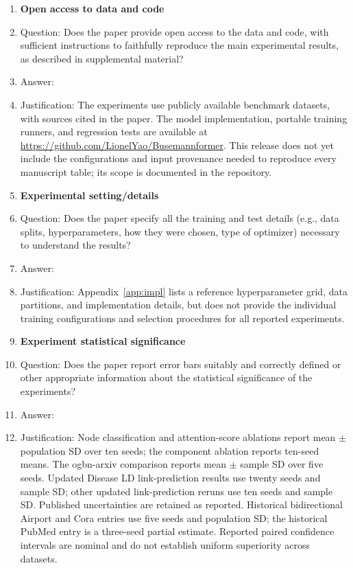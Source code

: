 \begin{enumerate}
\item {\bf Open access to data and code}
    \item[] Question: Does the paper provide open access to the data and code, with sufficient instructions to faithfully reproduce the main experimental results, as described in supplemental material?
    \item[] Answer: \answerYes{}
    \item[] Justification: The experiments use publicly available benchmark datasets, with sources
    cited in the paper. The model implementation, portable training runners,
    and regression tests are available at
    \url{https://github.com/LionelYao/Busemannformer}.
    This release does not yet include the configurations and input provenance
    needed to reproduce every manuscript table; its scope is documented in
    the repository.

\item {\bf Experimental setting/details}
    \item[] Question: Does the paper specify all the training and test details (e.g., data splits, hyperparameters, how they were chosen, type of optimizer) necessary to understand the results?
    \item[] Answer: \answerYes{}
    \item[] Justification: Appendix~\ref{app:impl} lists a reference hyperparameter grid, data partitions, and implementation details, but does not provide the individual training configurations and selection procedures for all reported experiments.

\item {\bf Experiment statistical significance}
    \item[] Question: Does the paper report error bars suitably and correctly defined or other appropriate information about the statistical significance of the experiments?
    \item[] Answer: \answerYes{}
    \item[] Justification: Node classification and attention-score ablations report mean
    $\pm$ population SD over ten seeds; the component ablation reports
    ten-seed means. The ogbn-arxiv comparison reports mean $\pm$ sample SD
    over five seeds. Updated Disease LD link-prediction results use twenty
    seeds and sample SD; other updated link-prediction reruns use ten seeds
    and sample SD. Published uncertainties are retained as reported.
    Historical bidirectional Airport and Cora entries use five seeds and
    population SD; the historical PubMed entry is a three-seed partial
    estimate. Reported paired confidence intervals are nominal and do not
    establish uniform superiority across datasets.


\end{enumerate}
